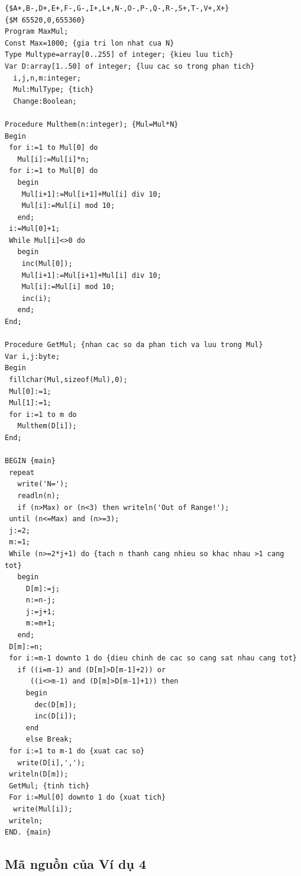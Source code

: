 \documentclass[11pt]{article}
\begin{document}
\begingroup
\scriptsize
\begin{verbatim}
{$A+,B-,D+,E+,F-,G-,I+,L+,N-,O-,P-,Q-,R-,S+,T-,V+,X+}
{$M 65520,0,655360}
Program MaxMul;
Const Max=1000; {gia tri lon nhat cua N}
Type Multype=array[0..255] of integer; {kieu luu tich}
Var D:array[1..50] of integer; {luu cac so trong phan tich}
  i,j,n,m:integer;
  Mul:MulType; {tich}
  Change:Boolean;

Procedure Multhem(n:integer); {Mul=Mul*N}
Begin
 for i:=1 to Mul[0] do
   Mul[i]:=Mul[i]*n;
 for i:=1 to Mul[0] do
   begin
    Mul[i+1]:=Mul[i+1]+Mul[i] div 10;
    Mul[i]:=Mul[i] mod 10;
   end;
 i:=Mul[0]+1;
 While Mul[i]<>0 do
   begin
    inc(Mul[0]);
    Mul[i+1]:=Mul[i+1]+Mul[i] div 10;
    Mul[i]:=Mul[i] mod 10;
    inc(i);
   end;
End;

Procedure GetMul; {nhan cac so da phan tich va luu trong Mul}
Var i,j:byte;
Begin
 fillchar(Mul,sizeof(Mul),0);
 Mul[0]:=1;
 Mul[1]:=1;
 for i:=1 to m do
   Multhem(D[i]);
End;

BEGIN {main}
 repeat
   write('N=');
   readln(n);
   if (n>Max) or (n<3) then writeln('Out of Range!');
 until (n<=Max) and (n>=3);
 j:=2;
 m:=1;
 While (n>=2*j+1) do {tach n thanh cang nhieu so khac nhau >1 cang tot}
   begin
     D[m]:=j;
     n:=n-j;
     j:=j+1;
     m:=m+1;
   end;
 D[m]:=n;
 for i:=m-1 downto 1 do {dieu chinh de cac so cang sat nhau cang tot}
   if ((i=m-1) and (D[m]>D[m-1]+2)) or
      ((i<>m-1) and (D[m]>D[m-1]+1)) then
     begin
       dec(D[m]);
       inc(D[i]);
     end
     else Break;
 for i:=1 to m-1 do {xuat cac so}
   write(D[i],',');
 writeln(D[m]);
 GetMul; {tinh tich}
 For i:=Mul[0] downto 1 do {xuat tich}
  write(Mul[i]);
 writeln;
END. {main}
\end{verbatim}
\endgroup

\subsection{Mã nguồn của Ví dụ 4}
\end{document}
